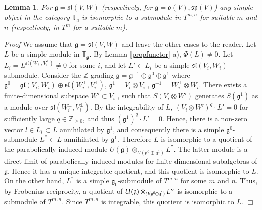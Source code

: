 \documentclass{svmult}
\newtheorem{lem}[theo]{Lemma}
\renewenvironment{proof}{ \emph{Proof}}{$\Box$}
\newcommand {\ZZ} {\mathbb {Z}}
\newcommand{\TT}{\mathbb{T}}
\renewcommand{\sp}{\mathfrak{sp}}
\renewcommand{\sl}{\mathfrak{sl}}
\newcommand{\oo}{\mathfrak{o}}
\renewcommand{\gg}{\mathfrak{g}}
\newcommand{\gl}{\mathfrak{gl}}
\begin{document}
\vspace{0.33cm}
\begin{lem}\label{tensor} For $\gg = \sl(V,W)$ (respectively, for  $\gg = \oo(V), \sp(V)$) 
any simple object in the category $\TT_\gg$ is isomorphic to a
submodule in $T^{m,n}$ for suitable $m$ and $n$ 
(respectively, in $T^m$ for a suitable $m$).
\end{lem}
\begin{proof} We assume that $\gg = \sl(V,W)$ and leave the other cases to the reader. 
Let $L$ be a simple module in $\TT_\gg$. By Lemma \ref{propfunctor}
a), 
$\Phi(L)\neq 0$. Let $L_i = L^{\sl(W_i^{\perp},V_i^{\perp})}\neq0$ for
some $i$, and let $L'\subset L_i$ be a simple $\sl(V_i,W_i)$-submodule. Consider the $\ZZ$-grading
$\gg=\gg^{-1}\oplus\gg^0\oplus\gg^1$ where 
$\gg^0=\gl(V_i,W_i)\oplus \sl(W_i^\perp,V_i^\perp)$, $\gg^1=V_i\otimes V_i^\perp$,  
$\gg^{-1}=W_i^\perp\otimes W_i$. There exists a finite-dimensional
subspace $W'\subset V_i^\perp$, such that 
$S(V_i\otimes W')$ generates $S(\gg^1)$ as a module over
$\sl(W_i^\perp,V_i^\perp)$. By the integrability of $L$, 
$(V_i\otimes W')^q\cdot L'=0$ for sufficiently large $q\in \ZZ_{\geq  0}$, and thus 
$(\gg^1)^q\cdot L'=0$. Hence, there is a non-zero vector $l\in L_i
\subset L$ annihilated by $\gg^1$, and consequently 
there is a simple $\gg^0$-submodule $L^{''} \subset L$ annihilated by
$\gg^1$. 
Therefore $L$ is isomorphic to a quotient of the parabolically induced module 
$U(\gg)\otimes_{U(\gg^0\oplus\gg^1)}L^{''}$. The latter module is a direct limit of 
parabolically induced modules for finite-dimensional subalgebras of
$\gg$. 
Hence it has a unique integrable quotient, and this quotient is
isomorphic to $L$. 
On the other hand, $L^{''}$ is a simple $\gg_0$-submodule of $T^{m,n}$
for some $m$ and $n$. 
Thus, by Frobenius reciprocity, a quotient of $U(\gg)\otimes_{U(\gg^0\oplus \gg^1)}L"$ is isomorphic to a submodule of $T^{m,n}$. Since $T^{m,n}$ is integrable, this quotient is isomorphic to $L$. 
\end{proof}
\end{document}
